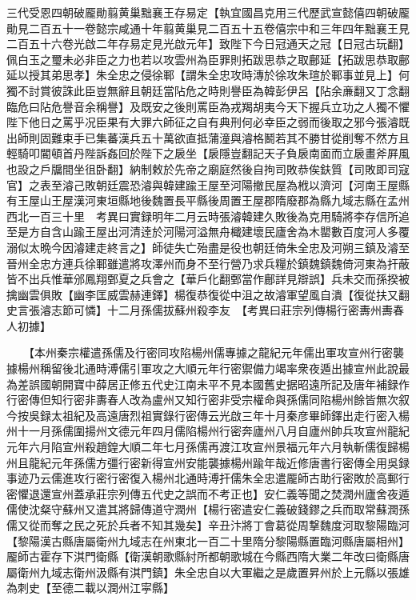 三代受恩四朝破龎勛翦黄巢黜襄王存易定【執宜國昌克用三代歷武宣懿僖四朝破龎勛見二百五十一卷懿宗咸通十年翦黄巢見二百五十五卷僖宗中和三年四年黜襄王見二百五十六卷光啟二年存易定見光啟元年】致陛下今日冠通天之冠【日冠古玩翻】佩白玉之璽未必非臣之力也若以攻雲州為臣罪則拓跋思恭之取鄜延【拓跋思恭取鄜延以授其弟思孝】朱全忠之侵徐鄆【謂朱全忠攻時漙於徐攻朱瑄於鄆事並見上】何獨不討賞彼誅此臣豈無辭且朝廷當阽危之時則譽臣為韓彭伊呂【阽余亷翻又丁念翻臨危曰阽危譽音余稱譽】及既安之後則罵臣為戎羯胡夷今天下握兵立功之人獨不懼陛下他日之罵乎况臣果有大罪六師征之自有典刑何必幸臣之弱而後取之邪今張濬既出師則固難束手已集蕃漢兵五十萬欲直抵蒲潼與濬格鬭若其不勝甘從削奪不然方且輕騎叩閽頓首丹陛訴姦回於陛下之扆坐【扆隱豈翻記天子負扆南面而立扆畫斧屛風也設之戶牖間坐徂卧翻】納制敕於先帝之廟庭然後自拘司敗恭俟鈇質【司敗即司寇官】之表至濬己敗朝廷震恐濬與韓建踰王屋至河陽撤民屋為栰以濟河【河南王屋縣有王屋山王屋漢河東垣縣地後魏置長平縣後周置王屋郡隋廢郡為縣九域志縣在孟州西北一百三十里　考異曰實録明年二月云時張濬韓建久敗後為克用騎將李存信所追至是方自含山踰王屋出河清逹於河陽河溢無舟檝建壞民廬舍為木罌數百度河人多覆溺似太晩今因濬建走終言之】師徒失亡殆盡是役也朝廷倚朱全忠及河朔三鎮及濬至晉州全忠方連兵徐鄆雖遣將攻澤州而身不至行營乃求兵糧於鎮魏鎮魏倚河東為扞蔽皆不出兵惟華邠鳳翔鄄夏之兵會之【華戶化翻鄄當作鄜詳見辯誤】兵未交而孫揆被擒幽雲俱敗【幽李匡威雲赫連鐸】楊復恭復從中沮之故濬軍望風自潰【復從扶又翻史言張濬志節可憐】十二月孫儒拔蘇州殺李友　【考異曰莊宗列傳楊行密夀州夀春人初據】

　　【本州秦宗權遣孫儒及行密同攻陷楊州儒專據之龍紀元年儒出軍攻宣州行密襲據楊州稱留後北通時溥儒引軍攻之大順元年行密禦備力竭率衆夜遁出據宣州此說最為差誤國朝開寶中薛居正修五代史江南未平不見本國舊史据昭遠所記及唐年補録作行密傳但知行密非夀春人改為盧州又知行密非受宗權命與孫儒同陷楊州餘皆無次叙今按吳録太祖紀及高遠唐烈祖實錄行密傳云光啟三年十月秦彦畢師鐸出走行密入楊州十一月孫儒圍揚州文德元年四月儒陷楊州行密奔廬州八月自廬州帥兵攻宣州龍紀元年六月陷宣州殺趙鍠大順二年七月孫儒再渡江攻宣州景福元年六月執斬儒復歸楊州且龍紀元年孫儒方彊行密新得宣州安能襲據楊州踰年哉近修唐書行密傳全用吳録事迹乃云儒進攻行密行密復入楊州北通時溥扞儒朱全忠遣龎師古助行密敗於高郵行密懼退還宣州蓋承莊宗列傳五代史之誤而不考正也】安仁義等聞之焚潤州廬舍夜遁儒使沈粲守蘇州又遣其將歸傳道守潤州【楊行密遣安仁義破錢鏐之兵而取常蘇潤孫儒又從而奪之民之死於兵者不知其幾矣】辛丑汴將丁會葛從周撃魏度河取黎陽臨河【黎陽漢古縣唐屬衛州九域志在州東北一百二十里隋分黎陽縣置臨河縣唐屬相州】龎師古霍存下淇門衛縣【衛漢朝歌縣紂所都朝歌城在今縣西隋大業二年改曰衛縣唐屬衛州九域志衛州汲縣有淇門鎮】朱全忠自以大軍繼之是歲置昇州於上元縣以張雄為刺史【至德二載以潤州江寜縣】

